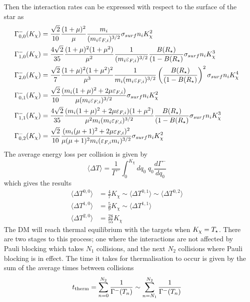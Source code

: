 Then the interaction rates can be expressed with respect to the surface of the star as
\begin{align}
    \Gamma_{0,0}^- (K_\chi) & = \frac{\sqrt{2}}{10}\frac{(1 +\mu)^2}{\mu} \frac{m_i}{(m_i \varepsilon_{F,i})^{3/2}}\sigma_{surf} n_i K_\chi^2\\
    \Gamma_{1,0}^- (K_\chi) & =\frac{4\sqrt{2}}{35}\frac{(1 + \mu)^2 (1 + \mu^2)}{\mu^2}\frac{1}{(m_i\varepsilon_{F,i})^{3/2}}\frac{B(R_\star)}{(1 - B(R_\star)}\sigma_{surf} n_i K_\chi^3\\
    \Gamma_{2,0}^- (K_\chi) & =\frac{\sqrt{2}}{7}\frac{(1 + \mu)^2 (1 + \mu^2)^2}{\mu^3}\frac{1}{m_i(m_i\varepsilon_{F,i})^{3/2}}\left( \frac{B(R_\star)}{(1 - B(R_\star)}\right)^2\sigma_{surf} n_i K_\chi^4\\
    \Gamma^-_{0,1}(K_\chi) & = \frac{\sqrt{2}}{10} \frac{(m_i(1 + \mu)^2 + 2 \mu \varepsilon_{F,i})}{\mu(m_i\varepsilon_{F,i})^{3/2}}\sigma_{surf} n_i K_\chi^2\\
    \Gamma_{1,1}^- (K_\chi) & =\frac{4\sqrt{2}}{35}\frac{(m_i(1 + \mu)^2 +2\mu\varepsilon_{F,i}) (1 + \mu^2)}{\mu^2m_i (m_i\varepsilon_{F,i})^{3/2}}\frac{B(R_\star)}{(1 - B(R_\star)}\sigma_{surf} n_i K_\chi^3\\
    \Gamma_{0,2}^- (K_\chi) & =\frac{\sqrt{2}}{10}\frac{(m_i(\mu +1)^2 + 2 \mu  \varepsilon_{F,i})^2}{\mu(\mu+1)^2 m_i (\varepsilon_{F,i}m_i)^{3/2}}\sigma_{surf} n_i K_\chi^2
\end{align}
The average energy loss per collision is given by
\begin{equation}
    \langle \Delta T \rangle = \frac{1}{\Gamma^-}\int_0^{K_\chi} dq_0\; q_0 \frac{d \Gamma^-}{d q_0}
\end{equation}
which gives the results
\begin{align}
    \langle \Delta T^{0,0} \rangle & = \frac{4}{7}K_\chi \sim \langle \Delta T^{0,1} \rangle \sim \langle \Delta T^{0,2} \rangle \\
    \langle \Delta T^{1,0} \rangle & = \frac{5}{9}K_\chi \sim \langle \Delta T^{1,1} \rangle\\
    \langle \Delta T^{2,0} \rangle & = \frac{28}{55}K_\chi 
\end{align}
The DM will reach thermal equilibrium with the targets when $K_\chi =T_\star$. There are two stages to this process; one where the interactions are not affected by Pauli blocking which takes $N_1$ collisions, and the next $N_2$ collisions where Pauli blocking is in effect. The time it takes for thermalisation to occur is given by the sum of the average times between collisions
\begin{equation}
    t_{\rm therm} = \sum_{n=0}^{N_2} \frac{1}{\Gamma^-(T_n)} \sim \sum_{n=N_1}^{N_2} \frac{1}{\Gamma^-(T_n)}
\end{equation}
